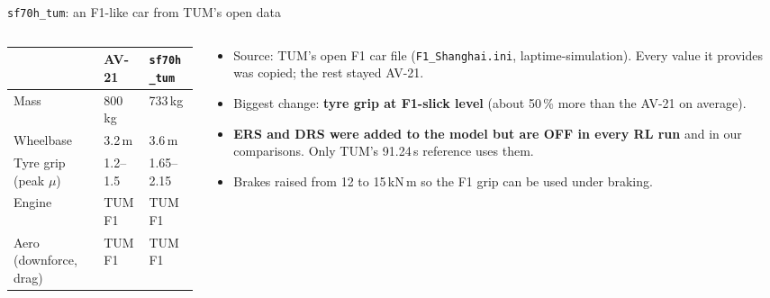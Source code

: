 \documentclass[aspectratio=169,10pt]{beamer}
\begin{document}
\begin{frame}{\texttt{sf70h\_tum}: an F1-like car from TUM's open data}
  \begin{columns}[T]
    \begin{column}{0.46\textwidth}
      \small
      \begin{tabular}{@{}lll@{}}
        \toprule
        & AV-21 & \texttt{sf70h\_tum}\\
        \midrule
        Mass & 800\,kg & 733\,kg\\
        Wheelbase & 3.2\,m & 3.6\,m\\
        Tyre grip (peak $\mu$) & 1.2--1.5 & 1.65--2.15\\
        Engine & TUM F1 & TUM F1\\
        Aero (downforce, drag) & TUM F1 & TUM F1\\
        \bottomrule
      \end{tabular}
    \end{column}
    \begin{column}{0.52\textwidth}
      \begin{itemize}
        \item Source: TUM's open F1 car file (\texttt{F1\_Shanghai.ini}, laptime-simulation). Every value it provides was copied; the rest stayed AV-21.
        \item Biggest change: \textbf{tyre grip at F1-slick level} (about 50\,\% more than the AV-21 on average).
        \item \textbf{ERS and DRS were added to the model but are OFF in every RL run} and in our comparisons. Only TUM's 91.24\,s reference uses them.
        \item Brakes raised from 12 to 15\,kN\,m so the F1 grip can be used under braking.
      \end{itemize}
    \end{column}
  \end{columns}
\end{frame}
\end{document}
